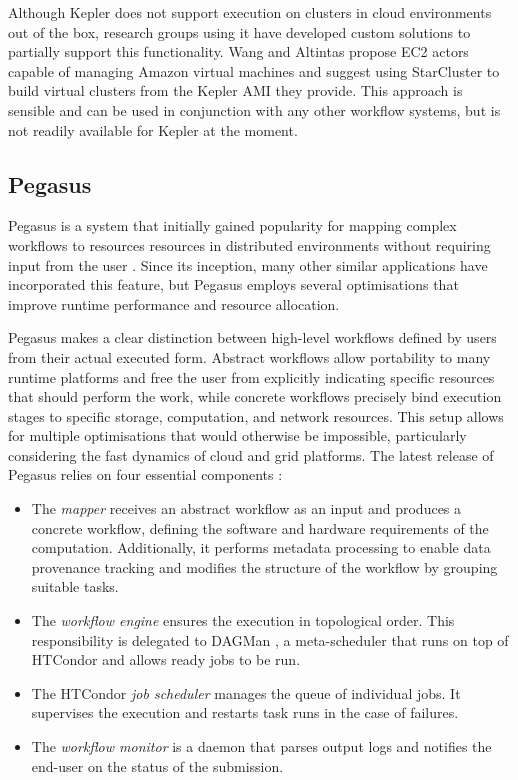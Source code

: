 Although Kepler does not support execution on clusters in cloud environments out of the box, research groups using it have developed custom solutions to partially support this functionality. Wang and Altintas \cite{Wang2012} propose EC2 actors capable of managing Amazon virtual machines and suggest using StarCluster \cite{StarCluster} to build virtual clusters from the Kepler AMI they provide. This approach is sensible and can be used in conjunction with any other workflow systems, but is not readily available for Kepler at the moment.

\subsection{Pegasus}

Pegasus \cite{Pegasus} is a system that initially gained popularity for mapping complex workflows to resources resources in distributed environments without requiring input from the user \cite{Deelman2004}. Since its inception, many other similar applications have incorporated this feature, but Pegasus employs several optimisations that improve runtime performance and resource allocation.

Pegasus makes a clear distinction between high-level workflows defined by users from their actual executed form. Abstract workflows allow portability to many runtime platforms and free the user from explicitly indicating specific resources that should perform the work, while concrete workflows precisely bind execution stages to specific storage, computation, and network resources. This setup allows for multiple optimisations that would otherwise be impossible, particularly considering the fast dynamics of cloud and grid platforms. The latest release of Pegasus relies on four essential components \cite{Deelman2013, Deelman2016}:

\begin{itemize}
	\item The \textit{mapper} receives an abstract workflow as an input and produces a concrete workflow, defining the software and hardware requirements of the computation. Additionally, it performs metadata processing to enable data provenance tracking and modifies the structure of the workflow by grouping suitable tasks.
	\item The \textit{workflow engine} ensures the execution in topological order. This responsibility is delegated to DAGMan \cite{DAGMan}, a meta-scheduler that runs on top of HTCondor \cite{HTCondor} and allows ready jobs to be run.
	\item The HTCondor \textit{job scheduler} manages the queue of individual jobs. It supervises the execution and restarts task runs in the case of failures.
	\item The \textit{workflow monitor} is a daemon that parses output logs and notifies the end-user on the status of the submission.
\end{itemize}


